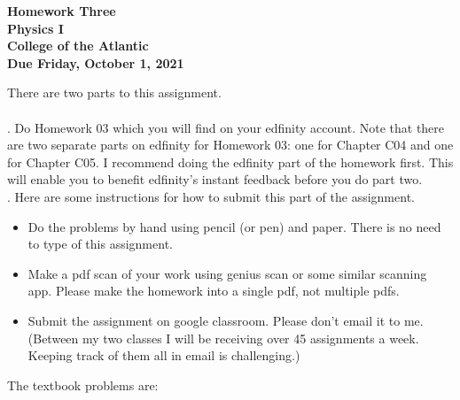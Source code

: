 \documentclass[12pt]{article}
\begin{document}
\pagestyle{empty}
 
\begin{center}
{\LARGE {\bf Homework Three}}\\
\bigskip
{\Large {\bf Physics I}}\\
\bigskip
{\Large {\bf College of the Atlantic}}\\
\bigskip
{ {\bf Due Friday, October 1, 2021}}\\ 
\end{center}
\medskip

\noindent There are two parts to this assignment.\\

\hspace{2mm}\\

.  Do Homework 03 which you will find
on your edfinity account.  Note that there are two separate parts on
edfinity for Homework 03: one for Chapter C04 and one for Chapter
C05.  I recommend doing the edfinity part of the homework first.  This
will enable you to benefit edfinity's instant feedback before you do
part two.\\ 


.  Here are some
instructions for how to submit this part of the assignment.
\begin{itemize}
\item Do the problems by hand using pencil (or pen) and paper.
  There is no need to type of this assignment.
\item Make a pdf scan of your work using genius scan or some
  similar scanning app.  Please make the homework into a single
  pdf, not multiple pdfs.
\item Submit the assignment on google classroom.  Please don't
  email it to me.  (Between my two classes I will be receiving
  over 45 assignments a week.  Keeping track of them all in email
  is challenging.)\\
\end{itemize}

\noindent The textbook problems are:   
\end{document}
